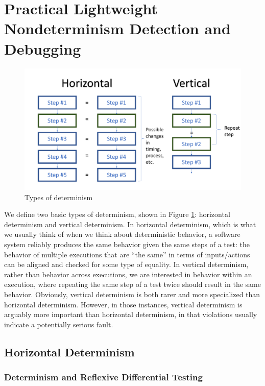 \section{Practical Lightweight Nondeterminism
  Detection and Debugging}

\begin{figure}
\includegraphics[width=\columnwidth]{types}
\caption{Types of determinism}
\label{fig:types}
\end{figure}

We define two basic types of determinism, shown in Figure
\ref{fig:types}:  horizontal determinism and vertical determinism.  In
horizontal determinism, which is what we usually think of when we
think about deterministic behavior, a software system reliably
produces the same behavior given the same steps of a test: the
behavior of multiple executions that are ``the same'' in terms of
inputs/actions can be aligned and checked for some type of equality.  In
vertical determinism, rather than behavior across executions, we are
interested in behavior within an execution, where repeating the same
step of a test twice should result in the same behavior.  Obviously,
vertical determinism is both rarer and more specialized than
horizontal determinism.  However, in those instances, vertical
determinism is arguably more important than horizontal determinism, in
that violations usually indicate a potentially serious fault.

\subsection{Horizontal Determinism}


\subsubsection{Determinism and Reflexive Differential Testing}

